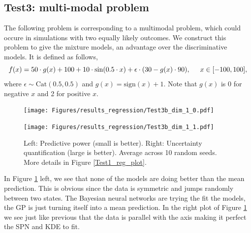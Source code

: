 \subsection*{Test3: multi-modal problem}
The following problem is corresponding to a multimodal problem, which could occure in simulations with
two equally likely outcomes. We construct this problem to give the mixture models, 
an advantage over the discriminative models. It is defined as follows, 
$$f(x) = 50\cdot g(x)+ 100 + 10\cdot \sin(0.5\cdot x) + \epsilon \cdot (30 - g(x) \cdot 90),
\hspace*{0.5cm}x \in [-100,100],$$ where $\epsilon \sim \text{Cat}(0.5,0.5)$ and $g(x) =
\text{sign}(x)+1$. Note that $g(x)$ is 0 for negative $x$ and 2 for positive $x$.

\begin{figure}[bth]
  \centering
  \begin{minipage}[b]{0.49\textwidth}
   \texttt{[image: Figures/results\_regression/Test3b\_dim\_1\_0.pdf]}
  \end{minipage}
  \hfill
  \begin{minipage}[b]{0.49\textwidth}
    \texttt{[image: Figures/results\_regression/Test3b\_dim\_1\_1.pdf]}
   \end{minipage}
  \caption{Left: Predictive power (small is better). Right: Uncertainty quantification (large is
  better). Average across 10 random seeds. More details in Figure \ref{Test1_reg_plot}.}
  \label{Test3_reg_plot}
\end{figure}

In Figure \ref{Test3_reg_plot} left, we see that none of the models are doing better than the mean
prediction. This is obvious since the data is symmetric and jumps randomly between two states. The
Bayesian neural networks are trying the fit the models, the GP is just turning itself into a mean
prediction. In the right plot of Figure \ref{Test3_reg_plot} we see just like previous that the data
is parallel with the axis making it perfect the SPN and KDE to fit. 


